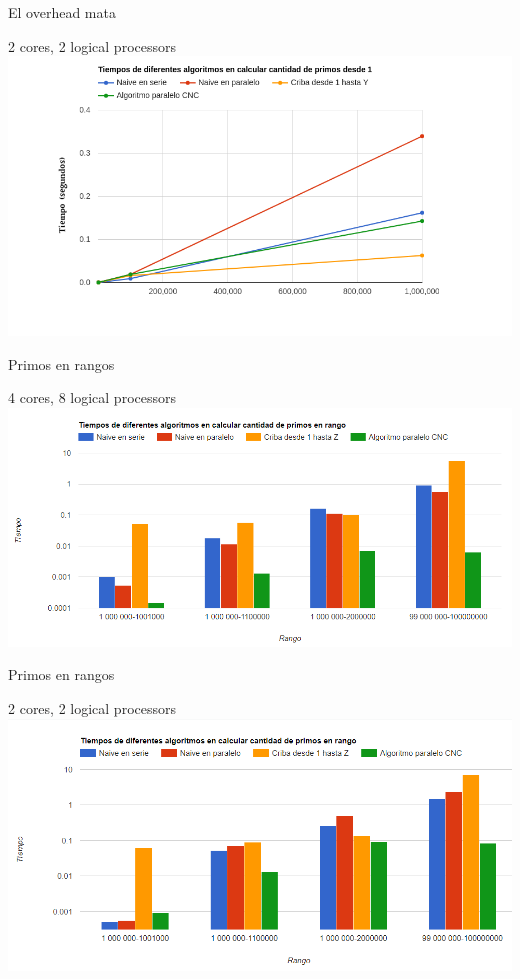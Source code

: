 \documentclass[compress]{beamer}
\begin{document}
\begin{frame}{El overhead mata}
  \begin{center}
  {2 cores, 2 logical processors}
  \\
  \includegraphics[width=1.15\textwidth]{imagenes/principioLucas.png}%
  \end{center}
\end{frame}

\begin{frame}{Primos en rangos}
  \begin{center}
  {4 cores, 8 logical processors}
  \\
  \includegraphics[width=1.15\textwidth]{imagenes/julian_rangos.png}%
  \end{center}
\end{frame}

\begin{frame}{Primos en rangos}
  \begin{center}
  {2 cores, 2 logical processors}
  \\
  \includegraphics[width=1.15\textwidth]{imagenes/lucas_rangos.png}%
  \end{center}
\end{frame}
\end{document}
